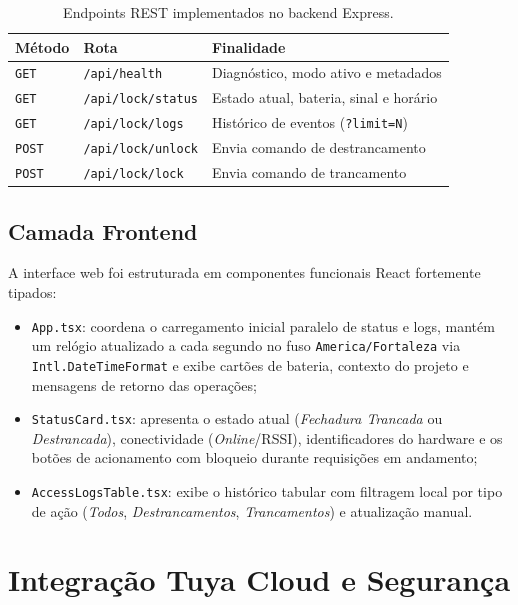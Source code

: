 \documentclass[10pt,twocolumn,a4paper]{article}
\begin{document}
\begin{table}[t]
\centering
\caption{Endpoints REST implementados no backend Express.}
\label{tab:rotas}
\scriptsize
\begin{tabular}{@{}lll@{}}
\toprule
\textbf{M\'etodo} & \textbf{Rota} & \textbf{Finalidade} \\
\midrule
\texttt{GET} & \texttt{/api/health} & Diagn\'ostico, modo ativo e metadados \\
\texttt{GET} & \texttt{/api/lock/status} & Estado atual, bateria, sinal e hor\'ario \\
\texttt{GET} & \texttt{/api/lock/logs} & Hist\'orico de eventos (\texttt{?limit=N}) \\
\texttt{POST} & \texttt{/api/lock/unlock} & Envia comando de destrancamento \\
\texttt{POST} & \texttt{/api/lock/lock} & Envia comando de trancamento \\
\bottomrule
\end{tabular}
\end{table}

\subsection{Camada Frontend}

A interface web foi estruturada em componentes funcionais React fortemente tipados:
\begin{itemize}
  \item \texttt{App.tsx}: coordena o carregamento inicial paralelo de status e logs, mant\'em um rel\'ogio atualizado a cada segundo no fuso \texttt{America/Fortaleza} via \texttt{Intl.DateTimeFormat} e exibe cart\~oes de bateria, contexto do projeto e mensagens de retorno das opera\c{c}\~oes;
  \item \texttt{StatusCard.tsx}: apresenta o estado atual (\textit{Fechadura Trancada} ou \textit{Destrancada}), conectividade (\textit{Online}/RSSI), identificadores do hardware e os bot\~oes de acionamento com bloqueio durante requisi\c{c}\~oes em andamento;
  \item \texttt{AccessLogsTable.tsx}: exibe o hist\'orico tabular com filtragem local por tipo de a\c{c}\~ao (\textit{Todos}, \textit{Destrancamentos}, \textit{Trancamentos}) e atualiza\c{c}\~ao manual.
\end{itemize}

\section{Integra\c{c}\~ao Tuya Cloud e Seguran\c{c}a}
\end{document}
